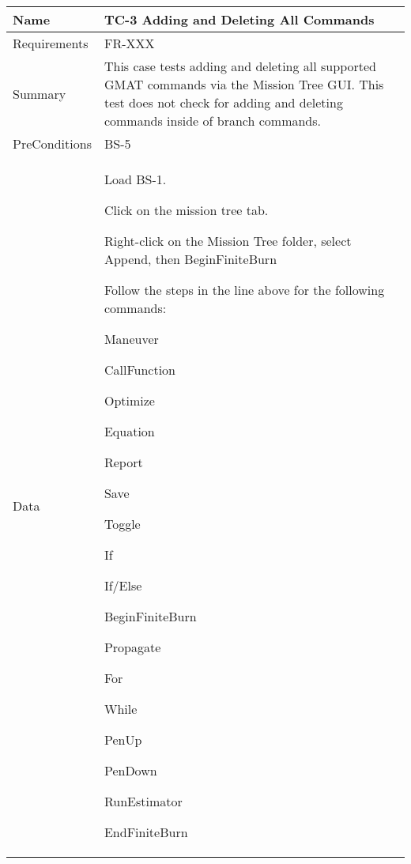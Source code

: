 \begin{table}[htbp!]
\centering
      \begin{tabular}{|p{1.05 in} |p{4.75 in} |}
      \hline
         \rowcolor[rgb]{0.8,0.8,0.8} Name & TC-3 Adding and Deleting All Commands\\
         \hline
         Requirements & FR-XXX\\  \hline
         Summary & This case tests adding and deleting all supported GMAT commands via the Mission
         Tree GUI.  This test does not check for adding and deleting commands inside of branch commands.\\  \hline
         PreConditions & BS-5\\     \hline
         Data &
         \begin{compactenum}
             \item Load BS-1.
             \item Click on the mission tree tab.
             \item Right-click on the Mission Tree folder, select Append, then BeginFiniteBurn
             \item Follow the steps in the line above for the following commands:
                \begin{compactenum}
                    \item Maneuver
                    \item CallFunction
                    \item Optimize
                    \item Equation
                    \item Report
                    \item Save
                    \item Toggle
                    \item If
                    \item If/Else
                    \item BeginFiniteBurn
                    \item Propagate
                    \item For
                    \item While
                    \item PenUp
                    \item PenDown
                    \item RunEstimator
                    \item EndFiniteBurn

\end{compactenum}
\end{compactenum}
\end{tabular}
\end{table}
